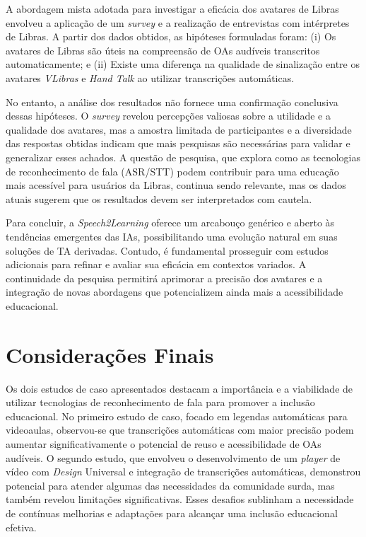 A abordagem mista adotada para investigar a eficácia dos avatares de Libras envolveu a aplicação de um \textit{survey} e a realização de entrevistas com intérpretes de Libras. A partir dos dados obtidos, as hipóteses formuladas foram: (i) Os avatares de Libras são úteis na compreensão de OAs audíveis transcritos automaticamente; e (ii) Existe uma diferença na qualidade de sinalização entre os avatares \textit{VLibras} e \textit{Hand Talk} ao utilizar transcrições automáticas.

No entanto, a análise dos resultados não fornece uma confirmação conclusiva dessas hipóteses. O \textit{survey} revelou percepções valiosas sobre a utilidade e a qualidade dos avatares, mas a amostra limitada de participantes e a diversidade das respostas obtidas indicam que mais pesquisas são necessárias para validar e generalizar esses achados. A questão de pesquisa, que explora como as tecnologias de reconhecimento de fala (ASR/STT) podem contribuir para uma educação mais acessível para usuários da Libras, continua sendo relevante, mas os dados atuais sugerem que os resultados devem ser interpretados com cautela.

Para concluir, a \textit{Speech2Learning} oferece um arcabouço genérico e aberto às tendências emergentes das IAs, possibilitando uma evolução natural em suas soluções de TA derivadas. Contudo, é fundamental prosseguir com estudos adicionais para refinar e avaliar sua eficácia em contextos variados. A continuidade da pesquisa permitirá aprimorar a precisão dos avatares e a integração de novas abordagens que potencializem ainda mais a acessibilidade educacional.

\section{Considerações Finais}

Os dois estudos de caso apresentados destacam a importância e a viabilidade de utilizar tecnologias de reconhecimento de fala para promover a inclusão educacional. No primeiro estudo de caso, focado em legendas automáticas para videoaulas, observou-se que transcrições automáticas com maior precisão podem aumentar significativamente o potencial de reuso e acessibilidade de OAs audíveis. O segundo estudo, que envolveu o desenvolvimento de um \textit{player} de vídeo com \textit{Design} Universal e integração de transcrições automáticas, demonstrou potencial para atender algumas das necessidades da comunidade surda, mas também revelou limitações significativas. Esses desafios sublinham a necessidade de contínuas melhorias e adaptações para alcançar uma inclusão educacional efetiva.

